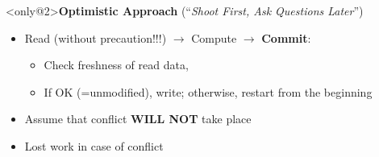 \documentclass[xcolor={x11names,svgnames},x11names,svgnames]{beamer}
\begin{document}
\begin{frame}[label=transactions]
\begin{overlayarea}{\textwidth}{4cm}
  \begin{exampleblock}<only@2>{\textbf{Optimistic Approach} (``\textit{Shoot First, Ask Questions Later}'')}
    \begin{itemize}
    \item Read (\alert{without precaution!!!}) $\rightarrow$ Compute $\rightarrow$ \textbf{Commit}:
      \begin{itemize}
      \item Check freshness of read data,
      \item If OK (=unmodified), write; otherwise, restart from the beginning
      \end{itemize}
    \item Assume that conflict \textbf{WILL NOT} take place
    \item Lost work in case of conflict
    \end{itemize}
  \end{exampleblock}    
\end{overlayarea}
\end{frame}

\end{document}

